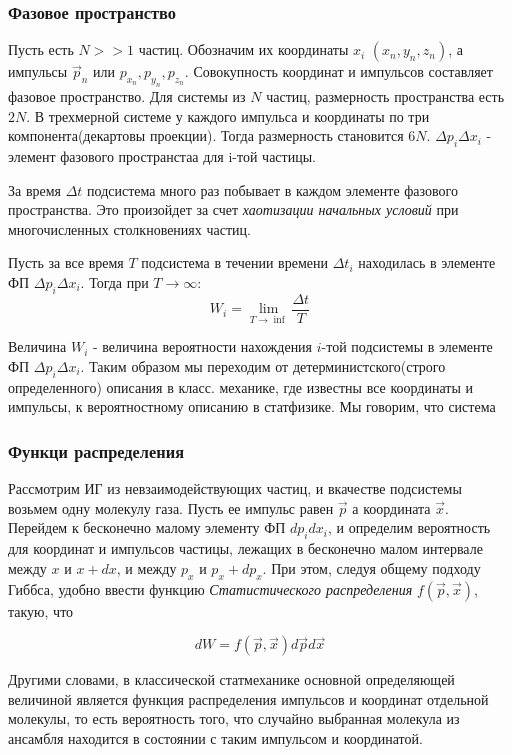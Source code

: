 \documentclass{article}
\begin{document}
\subsubsection{Фазовое пространство}

Пусть есть $N >>1$ частиц. Обозначим их координаты $x_i$ $(x_n, y_n, z_n)$, а импульсы $\vec p_n$ или $p_{x_n}, p_{y_n}, p_{z_n}$. Совокупность координат и импульсов составляет фазовое пространство. Для системы из $N$ частиц, размерность пространства есть $2N$. В трехмерной системе у каждого импульса и координаты по три компонента(декартовы проекции). Тогда размерность становится $6N$.
 $\Delta p_i\Delta x_i$ - элемент фазового пространстаа для i-той частицы.

За время $\Delta t$ подсистема много раз побывает в каждом элементе фазового пространства. Это произойдет за счет \emph{хаотизации начальных условий} при многочисленных столкновениях частиц. 

Пусть за все время $T$ подсистема в течении времени $\Delta t_i$ находилась в элементе ФП $\Delta p_i \Delta x_i$. Тогда при $T \to \infty$:
$$W_i = \lim _{T\to \inf}\frac{\Delta t}{T}$$

Величина $W_i$ - величина вероятности нахождения $i$-той подсистемы в элементе ФП $\Delta p_i \Delta x_i$. Таким образом мы переходим от детерминистского(строго определенного) описания в класс. механике, где известны все координаты и импульсы, к вероятностному описанию в статфизике. Мы говорим, что система

\subsubsection{Функци распределения}
Рассмотрим ИГ из невзаимодействующих частиц, и вкачестве подсистемы возьмем одну молекулу газа. Пусть ее импульс равен $\vec p$ а координата $\vec x$. Перейдем к бесконечно малому элементу ФП $d p_i d x_i$, и определим вероятность для координат и импульсов частицы, лежащих в бесконечно малом интервале между $x$ и $x+dx$, и между $p_x$ и $p_x+dp_x$. При этом, следуя общему подходу Гиббса, удобно ввести функцию \emph{Статистического распределения} $f(\vec p, \vec x)$, такую, что 

$$dW = f(\vec p, \vec x)d\vec p d\vec x$$

Другими словами,  в классической статмеханике основной определяющей величиной является функция распределения импульсов и координат отдельной молекулы, то есть вероятность того, что случайно выбранная молекула из ансамбля находится в состоянии с таким импульсом и координатой. 
\end{document}
